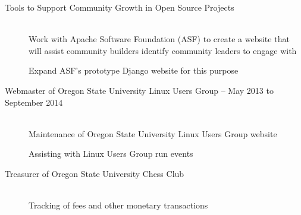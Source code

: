 \documentclass[11pt]{article}
\begin{document}
\smallskip
\hrulefill
\bigskip

\begin{description}
  \item [Tools to Support Community Growth in Open Source Projects]
    \hfill \\
    Work with Apache Software Foundation (ASF) to create a website that will
    assist community builders identify community leaders to engage with

    Expand ASF's prototype Django website for this purpose
\end{description}

\smallskip
\hrulefill
\bigskip

\begin{description}
     \item[Webmaster of Oregon State University Linux Users Group -- May 2013 to September 2014]
        \hfill \\
        Maintenance of Oregon State University Linux Users Group website

        Assisting with Linux Users Group run events

   \item[Treasurer of Oregon State University Chess Club]
        \hfill \\ 
        Tracking of fees and other monetary transactions
\end{description}
\end{document}
